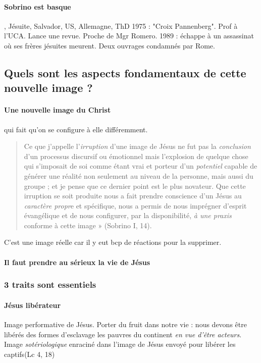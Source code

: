 \paragraph{Sobrino est basque}, Jésuite, Salvador, US, Allemagne, ThD 1975 : "Croix Pannenberg". Prof à l'UCA. Lance une revue. Proche de Mgr Romero. 1989 : échappe à un assassinat où ses frères jésuites meurent.
Deux ouvrages condamnés par Rome. 


\subsection{Quels sont les aspects fondamentaux de cette nouvelle image ?}

\paragraph{Une nouvelle image du Christ} qui fait qu'on se configure à elle différemment. 
\begin{quote}
    Ce que j’appelle l’\textit{irruption} d’une image de Jésus ne fut pas la \textit{conclusion} d’un processus discursif
ou émotionnel mais l’explosion de quelque chose qui s’imposait de soi comme étant vrai et porteur
d’un \textit{potentiel} capable de générer une réalité non seulement au niveau de la personne, mais aussi du
groupe ; et je pense que ce dernier point est le plus novateur. Que cette irruption se soit produite nous
a fait prendre conscience d’un Jésus au \textit{caractère propr}e et spécifique, nous a permis de nous
imprégner d’esprit évangélique et de nous configurer, par la disponibilité, \textit{à une praxis} conforme à
cette image » (Sobrino I, 14).
\end{quote}

C'est une image réelle car il y eut bcp de réactions pour la supprimer.

\paragraph{Il faut prendre au sérieux la vie de Jésus} 


\subsubsection{3 traits sont essentiels} 
\paragraph{Jésus libérateur}
  Image performative de Jésus. Porter du fruit dans notre vie : nous devons être libérés des formes d'esclavage les pauvres du continent \textit{en vue d'être acteurs}. Image \textit{sotériologique} enraciné dans l'image de Jésus envoyé pour libérer les captifs(Lc 4, 18)


